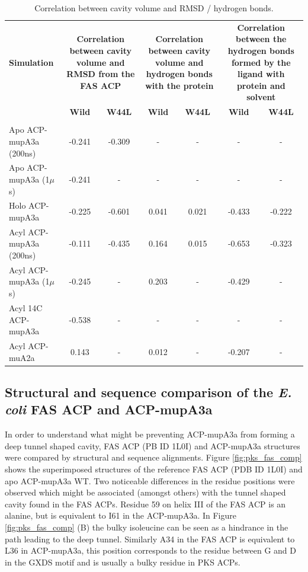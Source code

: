 	
	\begin{table}
	\caption{Correlation between cavity volume and RMSD / hydrogen bonds. }
	\label{tab:correlations}
	\begin{small}
	\begin{tabular}{l|cc|cc|cc}
	\toprule[2pt]
	\multicolumn{1}{p{5cm}|}{\textbf{Simulation}} & \multicolumn{ 2}{p{5cm}|}{\textbf{Correlation between cavity volume and RMSD from the FAS ACP}} & \multicolumn{ 2}{p{5cm}|}{\textbf{Correlation between cavity volume and hydrogen bonds with the protein}} & \multicolumn{ 2}{p{5cm}}{\textbf{Correlation between the hydrogen bonds formed by the ligand with protein and solvent}} \\ 
	\textbf{} & \textbf{Wild} & \textbf{W44L} & \textbf{Wild} & \textbf{W44L} & \textbf{Wild} & \textbf{W44L} \\ 
	 &  &  &  &  &  &  \\ 
	 \midrule[1pt]
	\multicolumn{1}{p{5cm}|}{Apo ACP-mupA3a (200ns)} & -0.241 & -0.309 & - & - & - & - \\ 
	\multicolumn{1}{p{5cm}|}{Apo ACP-mupA3a (1$ \mu $s)} & -0.241 & - & - & - & - & - \\ 
	\multicolumn{1}{p{5cm}|}{Holo ACP-mupA3a} & -0.225 & -0.601 & 0.041 & 0.021 & -0.433 & -0.222 \\ 
	\multicolumn{1}{p{5cm}|}{Acyl ACP-mupA3a (200ns)} & -0.111 & -0.435 & 0.164 & 0.015 & -0.653 & -0.323 \\ 
	\multicolumn{1}{p{5cm}|}{Acyl ACP-mupA3a (1$ \mu $s)} & -0.245 & - & 0.203 & - & -0.429 & - \\ 
	\multicolumn{1}{p{5cm}|}{Acyl 14C ACP-mupA3a} & -0.538 & - & - & - & - & - \\ 
	\multicolumn{1}{p{5cm}|}{Acyl ACP-muA2a} & 0.143 & - & 0.012 & - & -0.207 & - \\ 
	\bottomrule[2pt]
	\end{tabular}
	\end{small}

	\end{table}
	
	\subsection{Structural and sequence comparison of the \textit{E. coli} FAS ACP and ACP-mupA3a}
	\label{sec:PKSFASACP}
	In order to understand what might be preventing ACP-mupA3a from forming a deep tunnel shaped cavity, FAS ACP (PB ID 1L0I) and ACP-mupA3a structures were compared by structural and sequence alignments. Figure \ref{fig:pks_fas_comp} shows the superimposed structures of the reference FAS ACP (PDB ID 1L0I) and apo ACP-mupA3a WT. Two noticeable differences in the residue positions were observed which might be associated (amongst others) with the tunnel shaped cavity found in the FAS ACPs. Residue 59 on helix III of the FAS ACP is an alanine, but is equivalent to I61 in the ACP-mupA3a. In Figure \ref{fig:pks_fas_comp} (B) the bulky isoleucine can be seen as a hindrance in the path leading to the deep tunnel. Similarly A34 in the FAS ACP is equivalent to L36 in ACP-mupA3a, this position corresponds to the residue between G and D in the GXDS motif and is usually a bulky residue in PKS ACPs.
	
